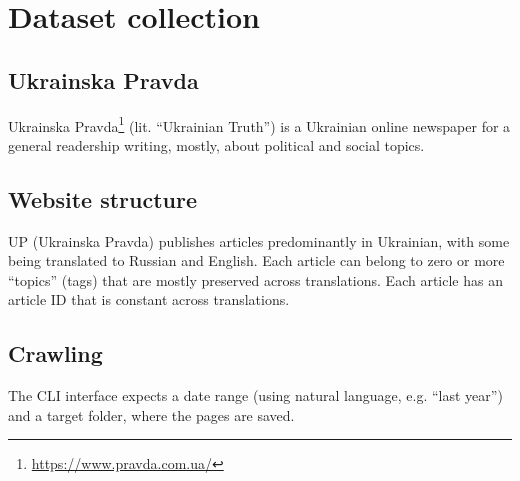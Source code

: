 \section{Dataset collection}
\label{sec:up-titles-collection}


\subsection{Ukrainska Pravda}
Ukrainska Pravda\footnote{\href{https://www.pravda.com.ua/}{https://www.pravda.com.ua/}} 
(lit. ``Ukrainian Truth'')
is a Ukrainian online newspaper for a general readership writing, mostly, about political and social topics.


\subsection{Website structure}

UP (Ukrainska Pravda) publishes articles predominantly in Ukrainian, with some being translated to Russian and English. Each article can belong to zero or more ``topics'' (tags) that are mostly preserved across translations.
Each article has an article ID that is constant across translations.

\subsection{Crawling}

The CLI interface expects a date range (using natural language, e.g. ``last year'') and a target folder, where the pages are saved.   

